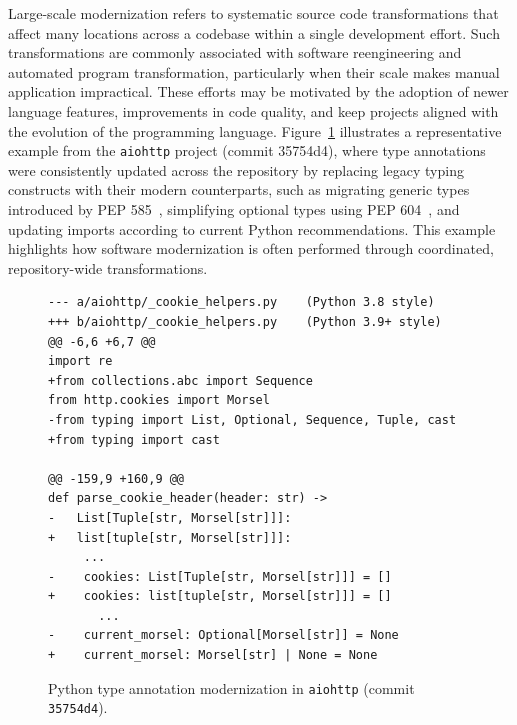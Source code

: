 Large-scale modernization refers to systematic source code transformations that affect many locations across a codebase within a single development effort. Such transformations are commonly associated with software reengineering and automated program transformation, particularly when their scale makes manual application impractical\cite{AKERS2007275}. These efforts may be motivated by the adoption of newer language features, improvements in code quality, and keep projects aligned with the evolution of the programming language. Figure~\ref{fig:modernization-example} illustrates a representative example from the \texttt{aiohttp} project (commit 35754d4), where type annotations were consistently updated across the repository by replacing legacy typing constructs with their modern counterparts, such as migrating generic types introduced by PEP 585~\cite{pep585}, simplifying optional types using PEP 604~\cite{pep604}, and updating imports according to current Python recommendations. This example highlights how software modernization is often performed through coordinated, repository-wide transformations.



\begin{figure}[H]
\begin{verbatim}
--- a/aiohttp/_cookie_helpers.py    (Python 3.8 style)
+++ b/aiohttp/_cookie_helpers.py    (Python 3.9+ style)
@@ -6,6 +6,7 @@
import re
+from collections.abc import Sequence
from http.cookies import Morsel
-from typing import List, Optional, Sequence, Tuple, cast
+from typing import cast

@@ -159,9 +160,9 @@
def parse_cookie_header(header: str) ->
-   List[Tuple[str, Morsel[str]]]:
+   list[tuple[str, Morsel[str]]]:
     ...                                                                         
-    cookies: List[Tuple[str, Morsel[str]]] = []
+    cookies: list[tuple[str, Morsel[str]]] = []
       ...
-    current_morsel: Optional[Morsel[str]] = None
+    current_morsel: Morsel[str] | None = None
\end{verbatim}
\caption{Python type annotation modernization in \texttt{aiohttp} (commit \texttt{35754d4}).}
\label{fig:modernization-example}
\end{figure}


